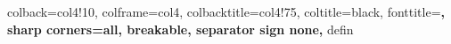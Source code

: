       {
      colback=col4!10, colframe=col4, colbacktitle=col4!75, coltitle=black,
      fonttitle=\bfseries,
      sharp corners=all,
      breakable,
      separator sign none,
      }%
{defin}%

\newtheorem{esem}{Esempio}[section]
\newtheorem{prop}{Proposizione}[section]
\newtheorem{lemma}{Lemma}[section]

\pagestyle{fancy}
\fancyhf{}
\fancyhead[EL]{\nouppercase\leftmark}
\fancyhead[OR]{\nouppercase\rightmark}
\fancyhead[ER,OL]{\thepage}
\fancyfoot[EC,OC]{\nouppercase\leftmark}

\renewcommand{\headrulewidth}{1pt}
\renewcommand{\footrulewidth}{1pt}
